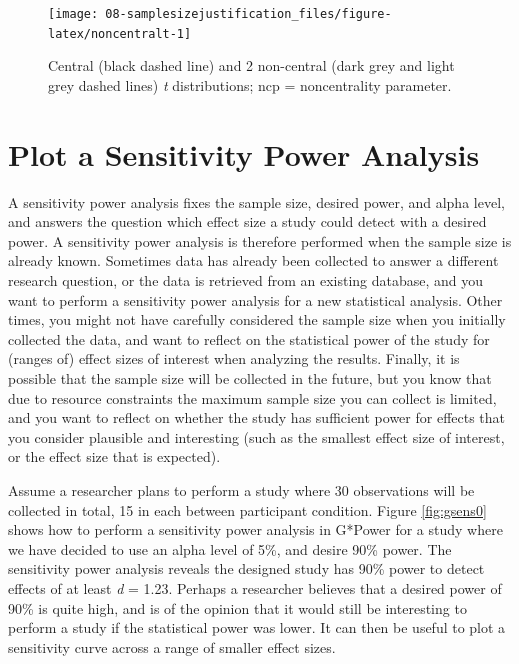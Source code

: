 \documentclass[
  oneside]{krantz}
\begin{document}
\begin{figure}

{\centering \texttt{[image: 08-samplesizejustification\_files/figure-latex/noncentralt-1]} 

}

\caption{Central (black dashed line) and 2 non-central (dark grey and light grey dashed lines) \emph{t} distributions; ncp = noncentrality parameter.}\label{fig:noncentralt}
\end{figure}

\hypertarget{plot-a-sensitivity-power-analysis}{%
\section{Plot a Sensitivity Power Analysis}\label{plot-a-sensitivity-power-analysis}}

A sensitivity power analysis fixes the sample size, desired power, and alpha level, and answers the question which effect size a study could detect with a desired power. A sensitivity power analysis is therefore performed when the sample size is already known. Sometimes data has already been collected to answer a different research question, or the data is retrieved from an existing database, and you want to perform a sensitivity power analysis for a new statistical analysis. Other times, you might not have carefully considered the sample size when you initially collected the data, and want to reflect on the statistical power of the study for (ranges of) effect sizes of interest when analyzing the results. Finally, it is possible that the sample size will be collected in the future, but you know that due to resource constraints the maximum sample size you can collect is limited, and you want to reflect on whether the study has sufficient power for effects that you consider plausible and interesting (such as the smallest effect size of interest, or the effect size that is expected).

Assume a researcher plans to perform a study where 30 observations will be collected in total, 15 in each between participant condition. Figure \ref{fig:gsens0} shows how to perform a sensitivity power analysis in G*Power for a study where we have decided to use an alpha level of 5\%, and desire 90\% power. The sensitivity power analysis reveals the designed study has 90\% power to detect effects of at least \emph{d} = 1.23. Perhaps a researcher believes that a desired power of 90\% is quite high, and is of the opinion that it would still be interesting to perform a study if the statistical power was lower. It can then be useful to plot a sensitivity curve across a range of smaller effect sizes.
\end{document}
